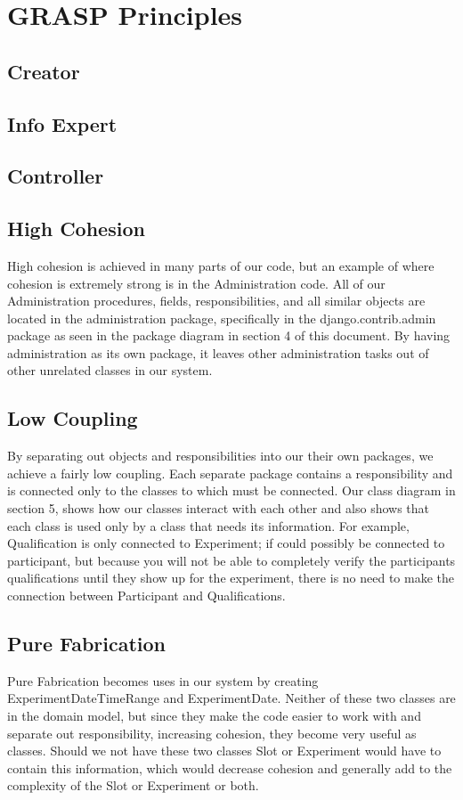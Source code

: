 \section{GRASP Principles}
\subsection{Creator}

\subsection{Info Expert}

\subsection{Controller}

\subsection{High Cohesion}
High cohesion is achieved in many parts of our code, but an example of where cohesion is extremely strong is in the Administration code.  All of our Administration  procedures, fields, responsibilities, and all similar objects are located in the administration package, specifically in the django.contrib.admin package as seen in the package diagram in section 4 of this document.  By having administration as its own package, it leaves other administration tasks out of other unrelated classes in our system.

\subsection{Low Coupling}
By separating out objects and responsibilities into our their own packages, we achieve a fairly low coupling.  Each separate package contains a responsibility and is connected only to the classes to which must be connected.  Our class diagram in section 5, shows how our classes interact with each other and also shows that each class is used only by a class that needs its information.  For example, Qualification is only connected to Experiment; if could possibly be connected to participant, but because you will not be able to completely verify the participants qualifications until they show up for the experiment, there is no need to make the connection between Participant and Qualifications.

\subsection{Pure Fabrication}
Pure Fabrication becomes uses in our system by creating ExperimentDateTimeRange and ExperimentDate.  Neither of these two classes are in the domain model, but since they make the code easier to work with and separate out responsibility, increasing cohesion, they become very useful as classes.  Should we not have these two classes Slot or Experiment would have to contain this information, which would decrease cohesion and generally add to the complexity of the Slot or Experiment or both.

